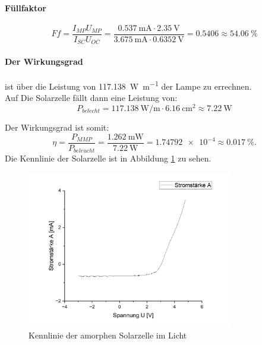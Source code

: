 \documentclass[12pt,a4paper,ngerman]{report}
\begin{document}
		\paragraph{Füllfaktor}
		
		$$    Ff=\frac{I_{MP}U_{MP}}{I_{SC}U_{OC}}= \frac{\qty{0,537}{\milli\ampere}\cdot \qty{2,35}{\volt}}{\qty{3,675}{\milli\ampere} \cdot \qty{0,6352}{\volt}} = \num{0,5406} \approx \qty{54,06}{\percent}  $$
		
		\paragraph{Der Wirkungsgrad} ist über die Leistung von \qty{117,138}{\watt\per\m} der Lampe zu errechnen.\\
		Auf Die Solarzelle fällt dann eine Leistung von:
		\[P_ {belecht} = \qty{117,138}{\watt\per\m} \cdot \qty{6,16}{\centi\m\squared} \approx \qty{7,22}{\watt}\]
		
		Der Wirkungsgrad ist somit:
		$$
		\eta=\frac{P_{MMP}}{P_{beleucht}} = \frac{\qty{1,262}{\milli\watt}}{\qty{7,22}{\watt}} = \num{1,74792e-4} \approx \qty{0,017}{\percent}.
		$$
		Die Kennlinie der Solarzelle ist in Abbildung \ref{fig:SolarAmorphHell} zu sehen.\\
		
		\begin{figure}
			\centering
			\includegraphics[width=0.8\textwidth]{Origin/SolarAmorphHell.png}
			\caption{Kennlinie der amorphen Solarzelle im Licht}
			\label{fig:SolarAmorphHell}
		\end{figure}
		
		

		


		
		
\end{document}
